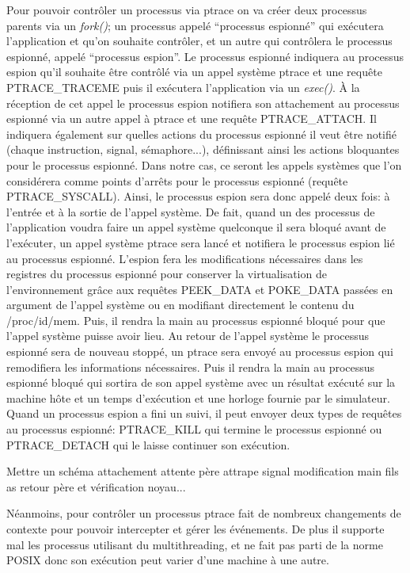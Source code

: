 Pour pouvoir contrôler un processus via ptrace on va créer deux processus
parents via un \textit{fork()}; un processus appelé ``processus espionné'' qui
exécutera l'application et qu'on souhaite contrôler, et un autre qui contrôlera
le processus espionné, appelé ``processus espion''. Le processus espionné
indiquera au processus espion qu'il souhaite être contrôlé via un appel système
ptrace et une requête PTRACE\_TRACEME puis il exécutera l'application via un
\textit{exec()}. À la réception de cet appel le processus espion notifiera son
attachement au processus espionné via un autre appel à ptrace et une requête
PTRACE\_ATTACH. Il indiquera également sur quelles actions du processus espionné
il veut être notifié (chaque instruction, signal, sémaphore...), définissant
ainsi les actions bloquantes pour le processus espionné. Dans notre cas, ce
seront les appels systèmes que l'on considérera comme points d'arrêts pour le
processus espionné (requête PTRACE\_SYSCALL). Ainsi, le processus espion sera
donc appelé deux fois: à l'entrée et à la sortie de l'appel système. De fait,
quand un des processus de l'application voudra faire un appel système quelconque
il sera bloqué avant de l'exécuter, un appel système ptrace sera lancé et
notifiera le processus espion lié au processus espionné. L'espion fera les
modifications nécessaires dans les registres du processus espionné pour
conserver la virtualisation de l'environnement grâce aux requêtes PEEK\_DATA et
POKE\_DATA passées en argument de l'appel système {\color{red}ou en modifiant
  directement le contenu du /proc/id/mem}. Puis, il rendra la main au processus
espionné bloqué pour que l'appel système puisse avoir lieu. Au retour de l'appel
système le processus espionné sera de nouveau stoppé, un ptrace sera envoyé au
processus espion qui remodifiera les informations nécessaires. Puis il rendra la
main au processus espionné bloqué qui sortira de son appel système avec un
résultat exécuté sur la machine hôte et un temps d'exécution et une horloge
fournie par le simulateur. Quand un processus espion a fini un suivi, il peut
envoyer deux types de requêtes au processus espionné: PTRACE\_KILL qui termine
le processus espionné ou PTRACE\_DETACH qui le laisse continuer son exécution.

{\color{red} Mettre un schéma attachement attente père attrape signal
  modification main fils as retour père et vérification noyau...}

Néanmoins, pour contrôler un processus ptrace fait de nombreux changements de
contexte pour pouvoir intercepter et gérer les événements. De plus il supporte
mal les processus utilisant du multithreading, et ne fait pas parti de la norme
POSIX donc son exécution peut varier d'une machine à une autre.

